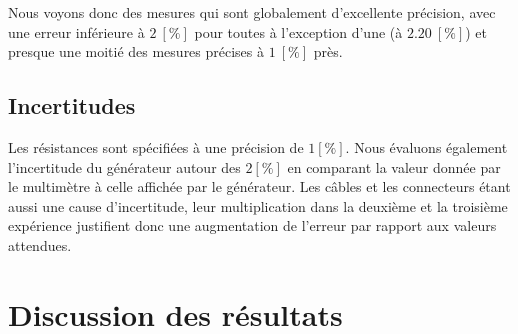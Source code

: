 \documentclass[11pt]{article}
\begin{document}
Nous voyons donc des mesures qui sont globalement d'excellente précision, avec une erreur inférieure à $2 \ [\%]$ pour toutes à l'exception d'une (à $2.20 \ [\%]$) et presque une moitié des mesures précises à $1 \ [\%]$ près.

\subsection{Incertitudes} \label{subsec:incert}

Les résistances sont spécifiées à une précision de $1 [\% ]$. Nous évaluons également l'incertitude du générateur autour des $2 [\% ]$ en comparant la valeur donnée par le multimètre à celle affichée par le générateur. Les câbles et les connecteurs étant aussi une cause d'incertitude, leur multiplication dans la deuxième et la troisième expérience justifient donc une augmentation de l'erreur par rapport aux valeurs attendues. 

\section{Discussion des résultats}
\end{document}
